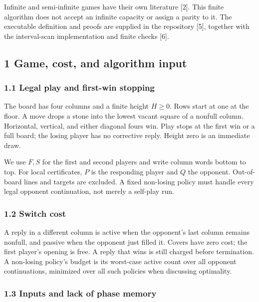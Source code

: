 \documentclass[
  a4paper,
]{article}
\begin{document}
Infinite and semi-infinite games have their own literature {[}2{]}. This
finite algorithm does not accept an infinite capacity or assign a parity
to it. The executable definition and proofs are supplied in the
repository {[}5{]}, together with the interval-scan implementation and
finite checks {[}6{]}.

\subsection{1 Game, cost, and algorithm
input}\label{game-cost-and-algorithm-input}

\subsubsection{1.1 Legal play and first-win
stopping}\label{legal-play-and-first-win-stopping}

The board has four columns and a finite height \(H\ge0\). Rows start at
one at the floor. A move drops a stone into the lowest vacant square of
a nonfull column. Horizontal, vertical, and either diagonal fours win.
Play stops at the first win or a full board; the losing player has no
corrective reply. Height zero is an immediate draw.

We use \(F,S\) for the first and second players and write column words
bottom to top. For local certificates, \(P\) is the responding player
and \(Q\) the opponent. Out-of-board lines and targets are excluded. A
fixed non-losing policy must handle every legal opponent continuation,
not merely a self-play run.

\subsubsection{1.2 Switch cost}\label{switch-cost}

A reply in a different column is active when the opponent's last column
remains nonfull, and passive when the opponent just filled it. Covers
have zero cost; the first player's opening is free. A reply that wins is
still charged before termination. A non-losing policy's budget is its
worst-case active count over all opponent continuations, minimized over
all such policies when discussing optimality.

\subsubsection{1.3 Inputs and lack of phase
memory}\label{inputs-and-lack-of-phase-memory}
\end{document}
